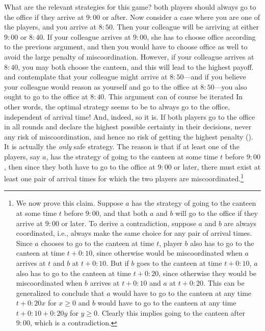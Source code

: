 What are the relevant strategies for this game?  both players should always go to the office if they arrive at $9{:}00$ or after. Now consider a case where you are one of the players, and you arrive at $8{:}50$. Then your colleague will be arriving at either $9{:}00$ or $8{:}40$. If your colleague arrives at $9{:}00$, she has to choose office according to the previous argument, and then you would have to choose office as well to avoid the large penalty of miscoordination. However, if your colleague arrives at $8{:}40$, you may both choose the canteen, and this will lead to the highest payoff.  and contemplate that your colleague might arrive at $8{:}50$---and if you believe your colleague would reason as yourself and go to the office at $8{:}50$---you also ought to go to the office at $8{:}40$. This argument can of course be iterated In other words, the optimal strategy seems to be to always go to the office, independent of arrival time! And, indeed, so it is. If both players go to the office in all rounds and declare the highest possible certainty in their decisions,    never any risk of miscoordination, and hence no risk of getting the highest penalty (). It is actually the \emph{only} safe strategy. The reason is that if at least one of the players, say $a$, has the strategy of going to the canteen at some time $t$ before $9{:}00$, then since they both have to go to the office at $9{:}00$ or later, there must exist at least one pair of arrival times for which the two players are miscoordinated.\footnote{
\label{footnote:no-cutoff}  
We now prove this claim. Suppose $a$ has the strategy of going to the canteen at some time $t$ before $9{:}00$, and that both $a$ and $b$ will go to the office if they arrive at $9{:}00$ or later. To derive a contradiction, suppose $a$ and $b$ are always coordinated, i.e., always make the same choice for any pair of arrival times. Since $a$ chooses to go to the canteen at time $t$, player $b$ also has to go to the canteen at time $t+0{:}10$, since otherwise  would be miscoordinated when $a$ arrives at $t$ and $b$ at $t+0{:}10$. But if $b$ goes to the canteen at time $t+0{:}10$, $a$ also has to go to the canteen at time $t+0{:}20$, since otherwise they would be miscoordinated when $b$ arrives at $t+0{:}10$ and $a$ at $t+0{:}20$. This can be generalized to conclude  that $a$ would have to go to the canteen at any time $t+0{:}20x$ for $x \geq 0$ and $b$ would have to go to the canteen at any time $t+0{:}10+0{:}20y$ for $y \geq 0$. Clearly this implies going to the canteen after $9{:}00$, which is a contradiction.}

